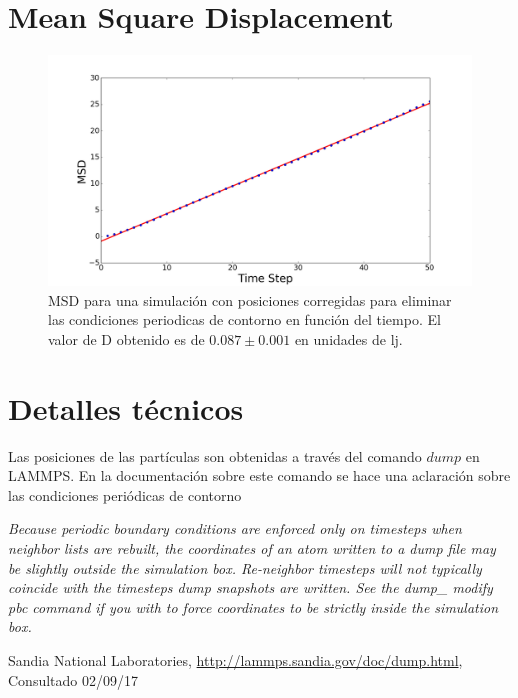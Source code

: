 \documentclass[
 reprint,
 amsmath,amssymb,
 aps,
 a4paper
]{revtex4-1}
\begin{document}
\section{\label{seq:msd}Mean Square Displacement}

\begin{figure}[H]
\centerline{
  \includegraphics[width=1.0\linewidth]{msdvst.png}}
  \caption{\small MSD para una simulación con posiciones corregidas para eliminar las condiciones periodicas de contorno en función del tiempo. El valor de D obtenido es de $0.087 \pm 0.001$ en unidades de lj.}
  \label{fig:forcs}
\end{figure}


\section{\label{seq:details}Detalles técnicos}
Las posiciones de las partículas son obtenidas a través del comando $dump$ en LAMMPS. En la documentación\cite{dumplammps} sobre este comando se hace una aclaración sobre las condiciones periódicas de contorno
\begin{framed}
\textit{Because periodic boundary conditions are enforced only on timesteps when neighbor lists are rebuilt, the coordinates of an atom written to a dump file may be slightly outside the simulation box. Re-neighbor timesteps will not typically coincide with the timesteps dump snapshots are written. See the dump\_ modify pbc command if you with to force coordinates to be strictly inside the simulation box.}
\end{framed}


\begin{thebibliography}{9}

  Sandia National Laboratories,
  \url{http://lammps.sandia.gov/doc/dump.html},
  Consultado 02/09/17

\end{thebibliography}
\end{document}
